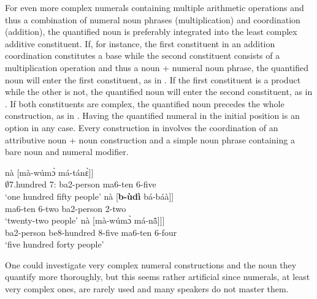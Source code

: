 For even more complex numerals containing multiple arithmetic operations and thus a combination of numeral noun phrases (multiplication) and coordination (addition), the quantified noun is preferably integrated into the least complex additive constituent. If, for instance, the first constituent in an addition coordination constitutes a base while the second constituent consists of a multiplication operation and thus a noun + numeral noun phrase, the quantified noun will enter the first constituent, as in . If the first constituent is a product while the other is not, the quantified noun will enter the second constituent, as in . If both constituents are complex, the quantified noun precedes the whole construction, as in . Having the quantified numeral in the initial position is an option in any case. Every construction in  involves the coordination of an attributive noun + noun construction and a simple noun phrase containing a bare noun and numeral modifier.

\ea\label{NumCoord6}
\ea \label{NumCoord6a}
  \gll   [[bwúyà yá {\bfseries b-ùdì}] nà [mà-wúmɔ̀ má-tánɛ̀]] \\
{\db}{\db}$\emptyset$7.hundred 7:{\ATT} ba2-person {\COM} {\db}ma6-ten 6-five \\
    \trans `one hundred fifty people'
\ex\label{NumCoord6b}
 \gll   [[mà-wúmɔ̀ má-báà] nà [{\bfseries b-ùdì} bá-báà]] \\
{\db}{\db}ma6-ten 6-two {\COM} {\db}ba2-person 2-two \\
    \trans `twenty-two people'
\ex\label{NumCoord6c}
 \gll   [{\bfseries b-ùdì} [[bì-bwúyà bé-tánɛ̀] nà [mà-wúmɔ̀ má-nã̂]]] \\
{\db}ba2-person {\db}{\db}be8-hundred 8-five {\COM} {\db}ma6-ten 6-four \\
    \trans `five hundred forty people'
\z
\z

One could investigate very complex numeral constructions and the noun they quantify more thoroughly, but this seems rather artificial since numerals, at least very complex ones, are rarely used and many speakers do not master them.



















